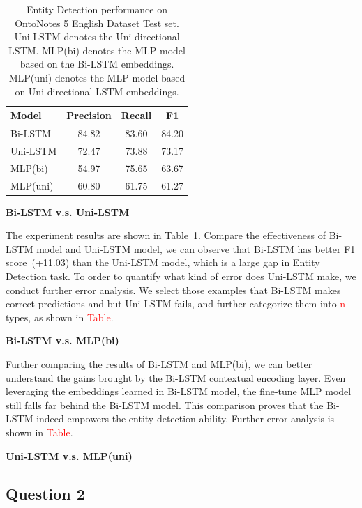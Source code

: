 \documentclass{article}
\newcommand{\red}[1]{\textcolor{red}{#1}}
\begin{document}
\begin{table}[t]
	\centering
	\begin{tabular}{l@{\qquad}ccc}
		\toprule
		\textbf{Model}         & \textbf{Precision} & \textbf{Recall} & \textbf{F1} \\ \midrule
		Bi-LSTM &  84.82 & 83.60  & 84.20 \\
		Uni-LSTM & 72.47 & 73.88 & 73.17 \\
		MLP(bi) & 54.97 & 75.65 & 63.67 \\ 
		MLP(uni) & 60.80 & 61.75 &  61.27 \\ 
		\bottomrule
	\end{tabular}
	\vspace{3mm}
	\caption{Entity Detection performance on OntoNotes 5 English Dataset Test set. Uni-LSTM denotes the Uni-directional LSTM. MLP(bi) denotes the MLP model based on the Bi-LSTM embeddings. MLP(uni) denotes the MLP model based on Uni-directional LSTM embeddings.}
	\label{res:ner}
\end{table}


\noindent \textbf{Bi-LSTM v.s. Uni-LSTM}


The experiment results are shown in Table~\ref{res:ner}. Compare the effectiveness of Bi-LSTM model and Uni-LSTM model, we can observe that Bi-LSTM has better F1 score~(+11.03) than the Uni-LSTM model, which is a large gap in Entity Detection task. To order to quantify what kind of error does Uni-LSTM make, we conduct further error analysis. We select those examples that Bi-LSTM makes correct predictions and but Uni-LSTM fails, and further categorize them into \red{n} types, as shown in \red{Table}.



\noindent \textbf{Bi-LSTM v.s. MLP(bi)}

Further comparing the results of Bi-LSTM and MLP(bi), we can better understand the gains brought by the Bi-LSTM contextual encoding layer. Even leveraging the embeddings learned in Bi-LSTM model, the fine-tune MLP model still falls far behind the Bi-LSTM model. This comparison proves that the Bi-LSTM indeed empowers the entity detection ability. Further error analysis is shown in \red{Table}.


\noindent \textbf{Uni-LSTM v.s. MLP(uni)}





\subsection{Question 2}
\end{document}
